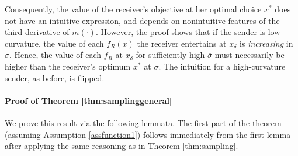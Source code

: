 \documentclass[11pt,dvipsnames]{article}
\begin{document}
\begin{appendix}
Consequently, the value of the receiver's objective at her optimal choice $x^*$ does not have an intuitive expression, and depends on nonintuitive features of the third derivative of $m(\cdot)$.
However, the proof shows that if the sender is low-curvature, the value of each $f_R(x)$ the receiver entertains at $x_\delta$ is \emph{increasing} in $\sigma$.
Hence, the value of each $f_R$ at $x_\delta$ for sufficiently high $\overline{\sigma}$ must necessarily be higher than the receiver's optimum $x^*$ at $\underline{\sigma}$.
The intuition for a high-curvature sender, as before, is flipped.



\paragraph{Proof of Theorem \ref{thm:samplinggeneral}}
We prove this result via the following lemmata. The first part of the theorem (assuming Assumption \ref{assfunction1}) follows immediately from the first lemma after applying the same reasoning as in Theorem \ref{thm:sampling}. 



\end{appendix}
\end{document}
